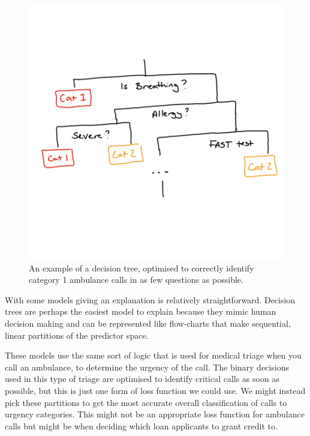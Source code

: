 \documentclass[
  12pt,
]{book}
\begin{document}
\begin{figure}

{\centering \includegraphics[width=12.5in]{images/402-production-explainability/ambulance-triage} 

}

\caption{An example of a decision tree, optimised to correctly identify category 1 ambulance calls in as few questions as possible.}\label{fig:unnamed-chunk-2}
\end{figure}

With some models giving an explanation is relatively straightforward. Decision trees are perhaps the easiest model to explain because they mimic human decision making and can be represented like flow-charts that make sequential, linear partitions of the predictor space.

These models use the same sort of logic that is used for medical triage when you call an ambulance, to determine the urgency of the call. The binary decisions used in this type of triage are optimised to identify critical calls as soon as possible, but this is just one form of loss function we could use. We might instead pick these partitions to get the most accurate overall classification of calls to urgency categories. This might not be an appropriate loss function for ambulance calls but might be when deciding which loan applicants to grant credit to.
\end{document}
